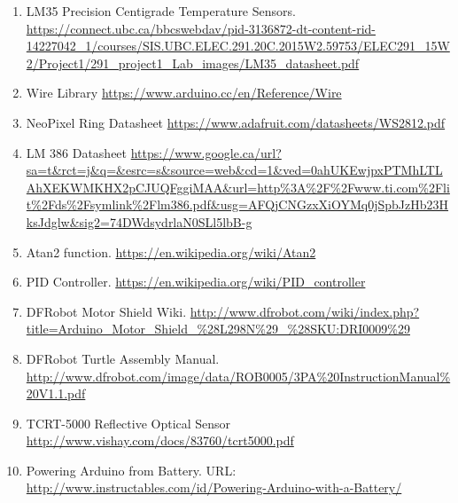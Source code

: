 \documentclass[paper=a4, fontsize=11pt]{scrartcl}
\numberwithin{equation}{section}		%
\numberwithin{figure}{section}			%
\numberwithin{table}{section}				%
\begin{document}
{\begin{enumerate}
\item LM35 Precision Centigrade Temperature Sensors. \url{https://connect.ubc.ca/bbcswebdav/pid-3136872-dt-content-rid-14227042_1/courses/SIS.UBC.ELEC.291.20C.2015W2.59753/ELEC291_15W2/Project1/291_project1_Lab_images/LM35_datasheet.pdf}
\item 
Wire Library \url{https://www.arduino.cc/en/Reference/Wire}
\item
NeoPixel Ring Datasheet \url{https://www.adafruit.com/datasheets/WS2812.pdf}
\item
LM 386 Datasheet \url{https://www.google.ca/url?sa=t&rct=j&q=&esrc=s&source=web&cd=1&ved=0ahUKEwjpxPTMhLTLAhXEKWMKHX2pCJUQFggiMAA&url=http%3A%2F%2Fwww.ti.com%2Flit%2Fds%2Fsymlink%2Flm386.pdf&usg=AFQjCNGzxXiOYMq0jSpbJzHb23HksJdglw&sig2=74DWdsydrlaN0SLl5lbB-g}

\item Atan2 function. \url{https://en.wikipedia.org/wiki/Atan2}
\item PID Controller. \url{https://en.wikipedia.org/wiki/PID_controller}
\item DFRobot Motor Shield Wiki. \url{http://www.dfrobot.com/wiki/index.php?title=Arduino_Motor_Shield_%28L298N%29_%28SKU:DRI0009%29}
\item DFRobot Turtle Assembly Manual. \url{http://www.dfrobot.com/image/data/ROB0005/3PA%20InstructionManual%20V1.1.pdf}
\item TCRT-5000 Reflective Optical Sensor \url{http://www.vishay.com/docs/83760/tcrt5000.pdf}
\item Powering Arduino from Battery. URL: \newline \url{http://www.instructables.com/id/Powering-Arduino-with-a-Battery/}


\end{enumerate}
\newpage
}
\end{document}
